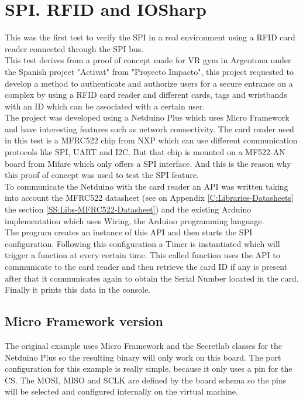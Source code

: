 \section{SPI. RFID and IOSharp}\label{S:rfid-iosharp}
This was the first test to verify the SPI in a real environment using a RFID card reader connected through the SPI bus.
\\
This test derives from a proof of concept made for VR gym in Argentona under the Spanish project "Activat" from "Proyecto Impacto", this project requested to develop a method to authenticate and authorize users for a secure entrance on a complex by using a RFID card reader and different cards, tags and wristbands with an ID which can be associated with a certain user.
\\
The project was developed using a Netduino Plus which uses Micro Framework and have interesting features such as network connectivity. The card reader used in this test is a MFRC522 chip from NXP which can use different communication protocols like SPI, UART and \gls{I2C}. But that chip is mounted on a MF522-AN board from Mifare which only offers a SPI interface. And this is the reason why this proof of concept was used to test the SPI feature.
\\
To communicate the Netduino with the card reader an API was written taking into account the MFRC522 datasheet (see on Appendix \ref{C:Libraries-Datasheets} the section \ref{SS:Libs-MFRC522-Datasheet}) and the existing Arduino implementation which uses Wiring, the Arduino programming language.
\\
The program creates an instance of this API and then starts the SPI configuration. Following this configuration a Timer is instantiated which will trigger a function at every certain time. This called function uses the API to communicate to the card reader and then retrieve the card ID if any is present after that it communicates again to obtain the Serial Number located in the card. Finally it prints this data in the console.

\subsection{Micro Framework version}\label{S:IOEx-SPI-Netduino}
The original example uses Micro Framework and the Secretlab classes for the Netduino Plus so the resulting binary will only work on this board. The port configuration for this example is really simple, because it only uses a pin for the \gls{CS}. The \gls{MOSI}, \gls{MISO} and \gls{SCLK} are defined by the board schema so the pins will be selected and configured internally on the virtual machine.


